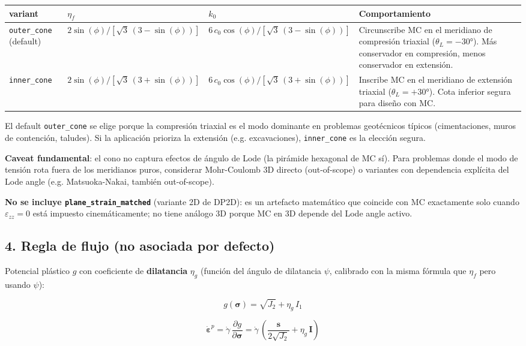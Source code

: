 \documentclass[11pt,letterpaper,oneside]{report}
\begin{document}
\begin{center}
\begin{tabularx}{\textwidth}{YYYY}
\hline
\textbf{variant} & \textbf{$\eta_f$} & \textbf{$k_0$} & \textbf{Comportamiento} \\
\hline
\texttt{outer\_cone} (default) & $2\sin(\phi)/[\sqrt 3\,(3 - \sin(\phi))]$ & $6\,c_0\cos(\phi)/[\sqrt 3\,(3 - \sin(\phi))]$ & Circunscribe MC en el meridiano de compresión triaxial ($\theta_L = -30°$). Más conservador en compresión, menos conservador en extensión. \\
\texttt{inner\_cone} & $2\sin(\phi)/[\sqrt 3\,(3 + \sin(\phi))]$ & $6\,c_0\cos(\phi)/[\sqrt 3\,(3 + \sin(\phi))]$ & Inscribe MC en el meridiano de extensión triaxial ($\theta_L = +30°$). Cota inferior segura para diseño con MC. \\
\hline
\end{tabularx}
\end{center}
El default \texttt{outer\_cone} se elige porque la compresión triaxial es el modo dominante en problemas geotécnicos típicos (cimentaciones, muros de contención, taludes). Si la aplicación prioriza la extensión (e.g. excavaciones), \texttt{inner\_cone} es la elección segura.

\textbf{Caveat fundamental}: el cono no captura efectos de ángulo de Lode (la pirámide hexagonal de MC sí). Para problemas donde el modo de tensión rota fuera de los meridianos puros, considerar Mohr-Coulomb 3D directo (out-of-scope) o variantes con dependencia explícita del Lode angle (e.g. Matsuoka-Nakai, también out-of-scope).

\textbf{No se incluye \texttt{plane\_strain\_matched}} (variante 2D de DP2D): es un artefacto matemático que coincide con MC exactamente solo cuando $\varepsilon_{zz} = 0$ está impuesto cinemáticamente; no tiene análogo 3D porque MC en 3D depende del Lode angle activo.

\subsection{4. Regla de flujo (no asociada por defecto)}

Potencial plástico $g$ con coeficiente de \textbf{dilatancia} $\eta_g$ (función del ángulo de dilatancia $\psi$, calibrado con la misma fórmula que $\eta_f$ pero usando $\psi$):

\[
g(\boldsymbol\sigma) = \sqrt{J_2} + \eta_g\,I_1
\]

\[
\dot{\boldsymbol\varepsilon}^p = \dot\gamma\,\frac{\partial g}{\partial \boldsymbol\sigma} = \dot\gamma\,\left(\frac{\mathbf s}{2\sqrt{J_2}} + \eta_g\,\mathbf I\right)
\]
\end{document}
